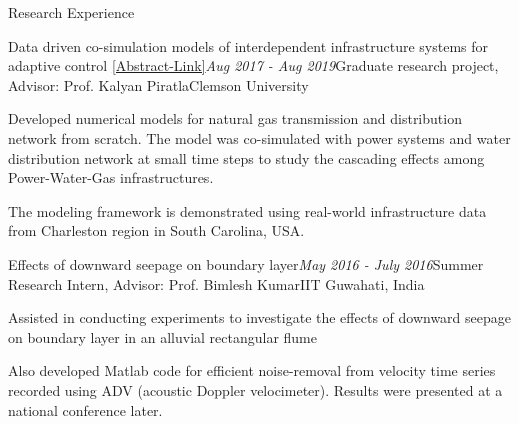 \documentclass{resume} %
\begin{document}
\begin{rSection}{Research Experience}
\begin{rSubsection}{Data driven co-simulation models of interdependent infrastructure systems for adaptive control \href{https://nsf.gov/awardsearch/showAward?AWD_ID=1638321&HistoricalAwards=false}{[Abstract-Link]}}{\em Aug 2017 - Aug 2019}{Graduate research project, Advisor: Prof. Kalyan Piratla}{Clemson University}
\item Developed numerical models for natural gas transmission and distribution network from scratch. The model was co-simulated with power systems and water distribution network at small time steps to study the cascading effects among Power-Water-Gas infrastructures.  
\item The modeling framework is demonstrated using real-world infrastructure data from Charleston region in South Carolina, USA. 
\end{rSubsection}



\begin{rSubsection}{Effects of downward seepage on boundary layer}{\em May 2016 - July 2016}{Summer Research Intern, Advisor: Prof. Bimlesh Kumar}{IIT Guwahati, India}
\item Assisted in conducting experiments to investigate the effects of downward seepage on boundary layer in an alluvial rectangular flume 
\item Also developed Matlab code for efficient noise-removal from velocity time series recorded using ADV (acoustic Doppler velocimeter). Results were presented at a national conference later. 
\end{rSubsection}
\end{rSection}
\end{document}
